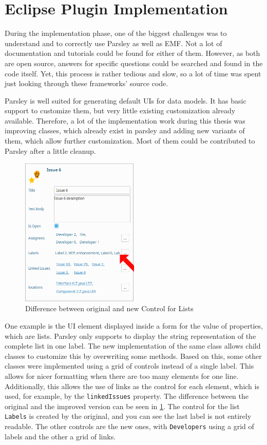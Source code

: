 \section{Eclipse Plugin Implementation}
\label{sec:ch4:s4}
During the implementation phase, one of the biggest challenges was to understand and to correctly use \gls{Parsley} as well as \gls{EMF}.
Not a lot of documentation and tutorials could be found for either of them.
However, as both are open source, answers for specific questions could be searched and found in the code itself.
Yet, this process is rather tedious and slow, so a lot of time was spent just looking through these frameworks' source code.

\Gls{Parsley} is well suited for generating default \glspl{UI} for data models.
It has basic support to customize them, 
but very little existing customization already available.
Therefore, a lot of the implementation work during this thesis was improving classes, which already exist in parsley 
and adding new variants of them, which allow further customization.
Most of them could be contributed to \gls{Parsley} after a little cleanup.

\begin{figure}[!h]
	\centering
	\includegraphics[width=0.5\textwidth]{graphics/screenshot_improvement_fromControl_arrow.png}
	\caption{Difference between original and new Control for Lists}
	\label{fig:c4:screenshot_improvement_formControl}
\end{figure}
One example is the \gls{UI} element displayed inside a form for the value of properties, which are lists.
Parsley only supports to display the string representation of the complete list in one label.
The new implementation of the same class allows child classes to customize this by overwriting some methods.
Based on this, some other classes were implemented using a grid of controls instead of a single label.
This allows for nicer formatting when there are too many elements for one line.
Additionally, this allows the use of links as the control for each element, which is used, for example, by the \lstinline|linkedIssues| property.
The difference between the original and the improved version can be seen in \cref{fig:c4:screenshot_improvement_formControl}.
The control for the list \lstinline|Labels| is created by the original, and you can see the last label is not entirely readable.
The other controls are the new ones, with \lstinline|Developers| using a grid of labels and the other a grid of links.

